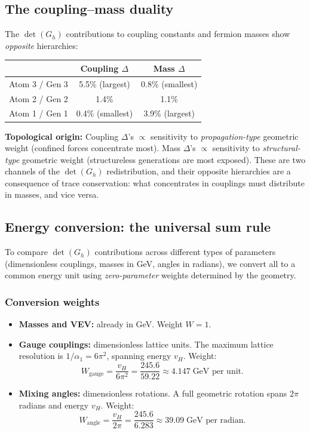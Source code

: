 \subsection{The coupling--mass duality}

The $\det(G_h)$ contributions to coupling constants and fermion masses show \emph{opposite} hierarchies:

\begin{center}
\begin{tabular}{lcc}
\hline
& Coupling $\Delta$ & Mass $\Delta$ \\
\hline
Atom 3 / Gen 3 & 5.5\% (largest) & 0.8\% (smallest) \\
Atom 2 / Gen 2 & 1.4\% & 1.1\% \\
Atom 1 / Gen 1 & 0.4\% (smallest) & 3.9\% (largest) \\
\hline
\end{tabular}
\end{center}

\textbf{Topological origin:} Coupling $\Delta$'s $\propto$ sensitivity to \emph{propagation-type} geometric weight (confined forces concentrate most). Mass $\Delta$'s $\propto$ sensitivity to \emph{structural-type} geometric weight (structureless generations are most exposed). These are two channels of the $\det(G_h)$ redistribution, and their opposite hierarchies are a consequence of trace conservation: what concentrates in couplings must distribute in masses, and vice versa.

\subsection{Energy conversion: the universal sum rule}

To compare $\det(G_h)$ contributions across different types of parameters (dimensionless couplings, masses in GeV, angles in radians), we convert all to a common energy unit using \emph{zero-parameter} weights determined by the geometry.

\subsubsection{Conversion weights}

\begin{itemize}
\item \textbf{Masses and VEV:} already in GeV. Weight $W = 1$.
\item \textbf{Gauge couplings:} dimensionless lattice units. The maximum lattice resolution is $1/\alpha_1 = 6\pi^2$, spanning energy $v_H$. Weight:
\begin{equation}
W_\text{gauge} = \frac{v_H}{6\pi^2} = \frac{245.6}{59.22} \approx 4.147\;\text{GeV per unit}.
\end{equation}
\item \textbf{Mixing angles:} dimensionless rotations. A full geometric rotation spans $2\pi$ radians and energy $v_H$. Weight:
\begin{equation}
W_\text{angle} = \frac{v_H}{2\pi} = \frac{245.6}{6.283} \approx 39.09\;\text{GeV per radian}.
\end{equation}
\end{itemize}

